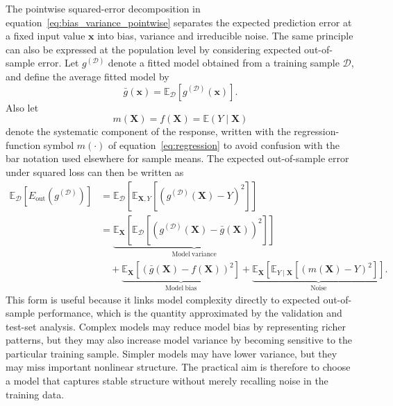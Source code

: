 \noindent
The pointwise squared-error decomposition in
equation~\eqref{eq:bias_variance_pointwise} separates the expected prediction
error at a fixed input value \(\mathbf{x}\) into bias, variance and irreducible
noise. The same principle can also be expressed at the population level by
considering expected out-of-sample error. Let \(g^{(\mathcal{D})}\) denote a
fitted model obtained from a training sample \(\mathcal{D}\), and define the
average fitted model by
\[
    \bar{g}(\mathbf{x})
    =
    \mathbb{E}_{\mathcal{D}}
    \!\left[
        g^{(\mathcal{D})}(\mathbf{x})
    \right].
\]
Also let
\[
    m(\mathbf{X})
    =
    f(\mathbf{X})
    =
    \mathbb{E}(Y\mid \mathbf{X})
\]
denote the systematic component of the response, written with the
regression-function symbol \(m(\cdot)\) of equation~\eqref{eq:regression}
to avoid confusion with the bar notation used elsewhere for sample means. The expected out-of-sample
error under squared loss can then be written as
\begin{equation}
\label{eq:bias_variance_population}
\begin{aligned}
    \mathbb{E}_{\mathcal{D}}
    \!\left[
        E_{\mathrm{out}}
        \!\left(
            g^{(\mathcal{D})}
        \right)
    \right]
    &=
    \mathbb{E}_{\mathcal{D}}
    \!\left[
        \mathbb{E}_{\mathbf{X},Y}
        \!\left[
            \left(
                g^{(\mathcal{D})}(\mathbf{X}) - Y
            \right)^2
        \right]
    \right]
    \\[4pt]
    &=
    \underbrace{
    \mathbb{E}_{\mathbf{X}}
    \!\left[
        \mathbb{E}_{\mathcal{D}}
        \!\left[
            \left(
                g^{(\mathcal{D})}(\mathbf{X})
                -
                \bar{g}(\mathbf{X})
            \right)^2
        \right]
    \right]
    }_{\mathrm{Model\ variance}}
    \\[4pt]
    &\quad+
    \underbrace{
    \mathbb{E}_{\mathbf{X}}
    \!\left[
        \left(
            \bar{g}(\mathbf{X})
            -
            f(\mathbf{X})
        \right)^2
    \right]
    }_{\mathrm{Model\ bias}}
    +
    \underbrace{
    \mathbb{E}_{\mathbf{X}}
    \!\left[
        \mathbb{E}_{Y\mid\mathbf{X}}
        \!\left[
            \left(
                m(\mathbf{X})
                -
                Y
            \right)^2
        \right]
    \right]
    }_{\mathrm{Noise}}.
\end{aligned}
\end{equation}
This form is useful because it links model complexity directly to expected
out-of-sample performance, which is the quantity approximated by the validation
and test-set analysis. Complex models may reduce model bias by representing
richer patterns, but they may also increase model variance by becoming sensitive
to the particular training sample. Simpler models may have lower variance, but
they may miss important nonlinear structure. The practical aim is therefore to
choose a model that captures stable structure without merely recalling noise in
the training data.

